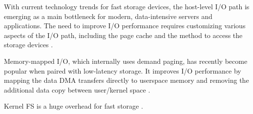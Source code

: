 With current technology trends for fast storage devices, the host-level I/O path is emerging as a main bottleneck for modern, data-intensive servers and applications. The need to improve I/O performance requires customizing various aspects of the I/O path, including the page cache and the method to access the storage devices \cite{papagiannis2021memory}.

Memory-mapped I/O, which internally uses demand paging, has recently become popular when paired with low-latency storage. It improves I/O performance by mapping the data DMA transfers directly to userspace memory and removing the additional data copy between user/kernel space \cite{li2019userland}.

Kernel FS is a huge overhead for fast storage \cite{yoshimura2019evfs}.


